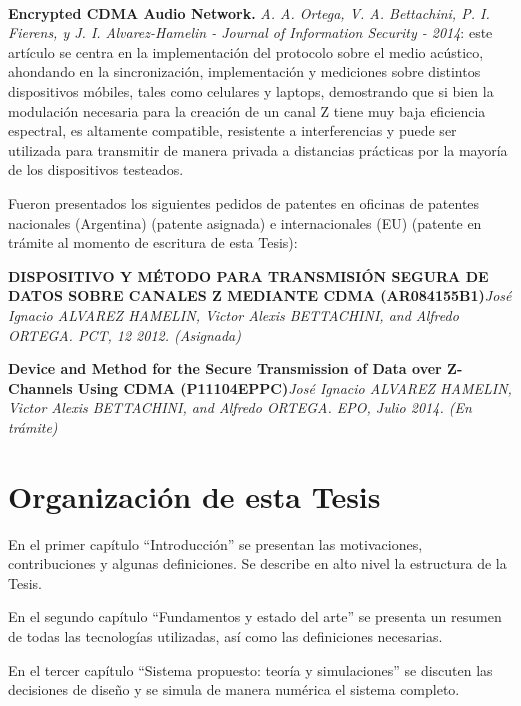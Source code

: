 \

\textbf{Encrypted CDMA Audio Network.} \textit{ A. A. Ortega, V. A. Bettachini, P. I. Fierens, y J. I. Alvarez-Hamelin -  Journal of Information Security - 2014}: este artículo se centra en la implementación del protocolo sobre el medio acústico, ahondando en la sincronización, implementación y mediciones sobre distintos dispositivos móbiles, tales como celulares y laptops, demostrando que si bien la modulación necesaria para la creación de un canal Z tiene muy baja eficiencia espectral, es altamente compatible, resistente a interferencias y puede ser utilizada para transmitir de manera privada a distancias prácticas por la mayoría de los dispositivos testeados.



Fueron presentados los siguientes pedidos de patentes en oficinas de patentes nacionales (Argentina) (patente asignada) e internacionales (EU) (patente en trámite al momento de escritura de esta Tesis):

\textbf{DISPOSITIVO Y MÉTODO PARA TRANSMISIÓN SEGURA DE DATOS SOBRE CANALES Z MEDIANTE CDMA (AR084155B1)}\textit{José Ignacio ALVAREZ HAMELIN, Victor Alexis BETTACHINI, and Alfredo ORTEGA. PCT, 12 2012. (Asignada)}

\textbf{Device and Method for the Secure Transmission of Data over Z-Channels Using CDMA (P11104EPPC)}\textit{José Ignacio ALVAREZ HAMELIN, Victor Alexis BETTACHINI, and Alfredo ORTEGA. EPO, Julio 2014. (En trámite)}




\section{Organización de esta Tesis}

En el primer capítulo ``Introducción'' se presentan las motivaciones, contribuciones y algunas definiciones. Se describe en alto nivel la estructura de la Tesis.

En el segundo capítulo ``Fundamentos y estado del arte'' se presenta un resumen de todas las tecnologías utilizadas, así como las definiciones necesarias.

En el tercer capítulo ``Sistema propuesto: teoría y simulaciones'' se discuten las decisiones de diseño y se simula de manera numérica el sistema completo.

